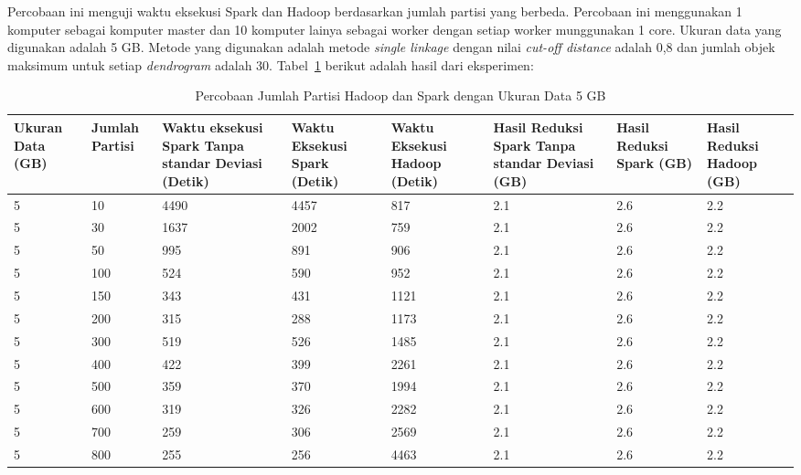 

Percobaan ini menguji waktu eksekusi Spark dan Hadoop berdasarkan jumlah partisi yang berbeda. Percobaan ini menggunakan 1 komputer sebagai komputer master dan 10 komputer lainya sebagai worker dengan setiap worker munggunakan 1 core. Ukuran data yang digunakan adalah 5 GB. Metode yang digunakan adalah metode \textit{single linkage} dengan nilai \textit{cut-off distance} adalah 0,8 dan jumlah objek maksimum untuk setiap \textit{dendrogram} adalah 30. Tabel~\ref{tab:spark5} berikut adalah hasil dari eksperimen:

\begin{table}[H] 
	\centering 
	\caption{Percobaan Jumlah Partisi Hadoop dan Spark dengan Ukuran Data 5 GB}
	\label{tab:spark5}
	\begin{tabular}{|p{1cm}|p{1cm}|p{2cm}|p{2cm}|p{2cm}|p{2cm}|p{2cm}|p{2cm}|}
\hline
Ukuran Data (GB) & Jumlah Partisi &  Waktu eksekusi Spark Tanpa standar Deviasi (Detik) & Waktu Eksekusi Spark (Detik) & Waktu Eksekusi Hadoop (Detik) & Hasil Reduksi Spark Tanpa standar Deviasi (GB) & Hasil Reduksi Spark (GB)  & Hasil Reduksi Hadoop (GB)\\ 
\hline
5  & 10 & 4490 & 4457 & 817 & 2.1 & 2.6 & 2.2\\
\hline
5  & 30 & 1637 & 2002 & 759 & 2.1 & 2.6 & 2.2\\
\hline
5  & 50 & 995 & 891 & 906 & 2.1 & 2.6 & 2.2 \\
\hline
5  & 100 & 524 & 590 & 952 & 2.1 & 2.6 & 2.2 \\
\hline
5  & 150 & 343 & 431 & 1121 & 2.1 & 2.6 & 2.2\\
\hline
5  & 200 & 315 & 288 & 1173 & 2.1 & 2.6 & 2.2\\
\hline
5  & 300 & 519 & 526 & 1485 & 2.1 & 2.6 & 2.2\\
\hline
5  & 400 & 422 & 399 & 2261 & 2.1 & 2.6 & 2.2 \\
\hline
5  & 500 & 359 & 370 & 1994 & 2.1 & 2.6 & 2.2\\
\hline
5  & 600 & 319 & 326 & 2282 & 2.1 & 2.6 & 2.2\\
\hline
5  & 700 & 259 & 306 & 2569 & 2.1 & 2.6 & 2.2\\
\hline
5  & 800 & 255 & 256 & 4463 & 2.1 & 2.6 & 2.2\\
\hline


\hline

	\end{tabular} 
\end{table}




